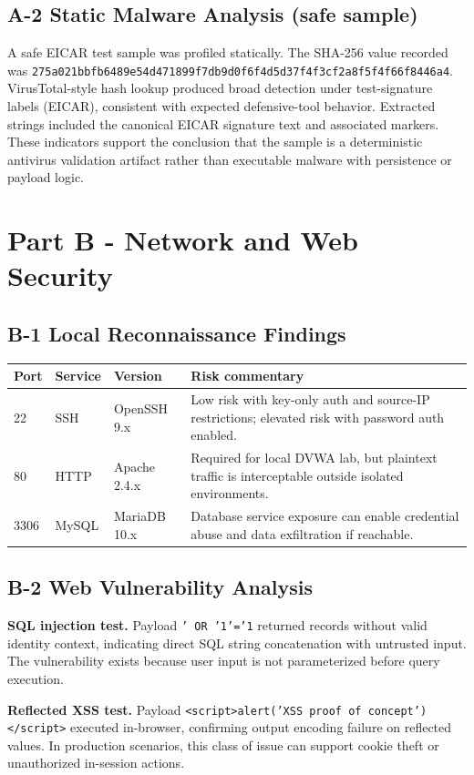 \documentclass[11pt,a4paper]{article}
\begin{document}
\subsection*{A-2 Static Malware Analysis (safe sample)}
A safe EICAR test sample was profiled statically. The SHA-256 value recorded was \texttt{275a021bbfb6489e54d471899f7db9d0f6f4d5d37f4f3cf2a8f5f4f66f8446a4}. VirusTotal-style hash lookup produced broad detection under test-signature labels (EICAR), consistent with expected defensive-tool behavior. Extracted strings included the canonical EICAR signature text and associated markers. These indicators support the conclusion that the sample is a deterministic antivirus validation artifact rather than executable malware with persistence or payload logic.

\section*{Part B - Network and Web Security}
\subsection*{B-1 Local Reconnaissance Findings}
\begin{longtable}{p{1.2cm}p{1.8cm}p{3.2cm}p{8.0cm}}
\toprule
Port & Service & Version & Risk commentary \\
\midrule
22 & SSH & OpenSSH 9.x & Low risk with key-only auth and source-IP restrictions; elevated risk with password auth enabled. \\
80 & HTTP & Apache 2.4.x & Required for local DVWA lab, but plaintext traffic is interceptable outside isolated environments. \\
3306 & MySQL & MariaDB 10.x & Database service exposure can enable credential abuse and data exfiltration if reachable. \\
\bottomrule
\end{longtable}

\subsection*{B-2 Web Vulnerability Analysis}
\textbf{SQL injection test.} Payload \texttt{' OR '1'='1} returned records without valid identity context, indicating direct SQL string concatenation with untrusted input. The vulnerability exists because user input is not parameterized before query execution.

\textbf{Reflected XSS test.} Payload \texttt{<script>alert('XSS proof of concept')</script>} executed in-browser, confirming output encoding failure on reflected values. In production scenarios, this class of issue can support cookie theft or unauthorized in-session actions.
\end{document}
